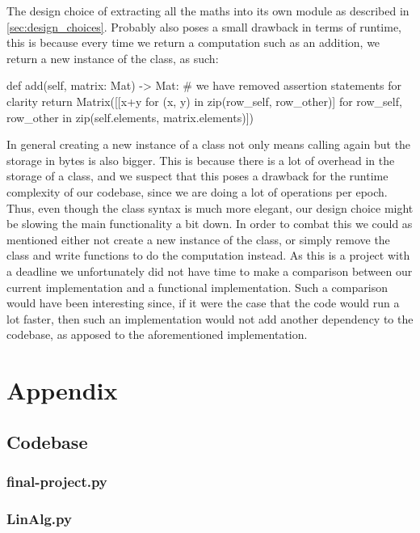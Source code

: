 \documentclass[a4paper,oneside,article,english]{memoir}
\begin{document}
The design choice of extracting all the maths into its own module as described
in \cref{sec:design_choices}. Probably also poses a small drawback in terms of
runtime, this is because every time we return a computation such as an addition,
we return a new instance of the class, as such:
\begin{python}
def add(self, matrix: Mat) -> Mat: 
  # we have removed assertion statements for clarity
  return Matrix([[x+y for (x, y) in zip(row_self, row_other)] for row_self, row_other in zip(self.elements, matrix.elements)])
\end{python}
In general creating a new instance of a class not only means calling
 again but the storage in bytes is also bigger.
This is because there is a lot of overhead in the storage of a class, and we
suspect that this poses a drawback for the runtime complexity of our codebase,
since we are doing a lot of operations per epoch. Thus, even though the class
syntax is much more elegant, our design choice might be slowing the main
functionality a bit down. In order to combat this we could as mentioned either
not create a new instance of the class, or simply remove the class and write
functions to do the computation instead. As this is a project with a deadline we
unfortunately did not have time to make a comparison between our current
implementation and a functional implementation. Such a comparison would have
been interesting since, if it were the case that the code would run a lot
faster, then such an implementation would not add another dependency to the
codebase, as apposed to the aforementioned  implementation.



\chapter{Appendix}  
\label{ch:appendix}

\section{Codebase}  
\label{sec:codebase}

\subsection{final-project.py}
\label{sub:final_project_py}



\subsection{LinAlg.py}
\label{sub:linAlg_py}


\end{document}
